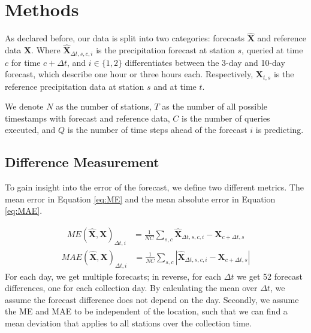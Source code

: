 \documentclass{article}
\theoremstyle{plain}
\theoremstyle{definition}
\theoremstyle{remark}
\begin{document}
\section{Methods}\label{sec:Methods}
As declared before, our data is split into two categories: forecasts
$\hat{\textbf{X}}$ and reference data $\textbf{X}$. Where
$\hat{\textbf{X}}_{\Delta t, s, c, i}$ is the precipitation forecast at station
$s$, queried at time $c$ for time $c + \Delta t$, and $i \in \{1, 2\}$
differentiates between the 3-day and 10-day forecast, which describe one hour
or three hours each.
Respectively, $\textbf{X}_{t, s}$ is the reference precipitation data at
station $s$ and at time $t$.

We denote $N$ as the number of stations, $T$ as the number of all possible
timestamps with forecast and reference data, $C$ is the number of queries
executed, and $Q$ is the number of time steps ahead of the forecast $i$ is
predicting.

\subsection{Difference Measurement}\label{sec:mean}
To gain insight into the error of the forecast, we define two different
metrics. The mean error in Equation \ref{eq:ME} and the mean absolute error in
Equation \ref{eq:MAE}.

\begin{align}
    ME(\hat{\mathbf{X}}, \textbf{X})_{\Delta t, i} & =	\frac{1}{N C} \sum_{s,
        c} \hat{\mathbf{X}}_{\Delta t, s, c, i} - \textbf{X}_{c + \Delta t, s}
    \label{eq:ME}
\end{align}
\begin{align}
    MAE(\hat{\mathbf{X}}, \textbf{X})_{\Delta t, i} & =	 \frac{1}{N C} \sum_{s,
        c} |\hat{\mathbf{X}}_{\Delta t, s, c, i} - \textbf{X}_{c + \Delta t, s}|
    \label{eq:MAE}
\end{align}
For each day, we get multiple forecasts; in reverse, for each $\Delta t$ we get
52 forecast differences, one for each collection day. By calculating the mean
over $\Delta t$, we assume the forecast difference does not depend on the day.
Secondly, we assume the ME and MAE to be independent of the location, such that
we can find a mean deviation that applies to all stations over the collection
time.
\end{document}
